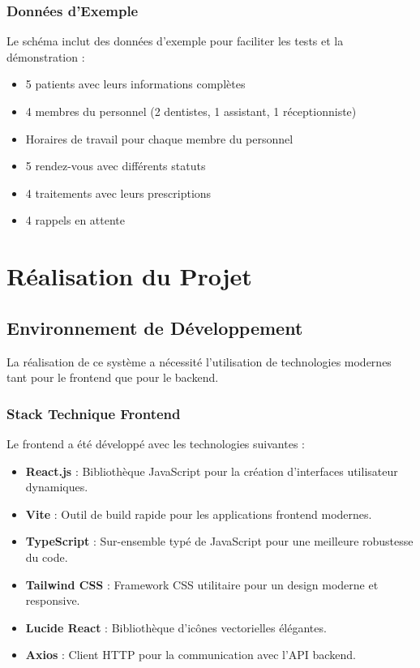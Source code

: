 \documentclass[12pt,a4paper]{report}
\begin{document}
\subsection{Données d'Exemple}

Le schéma inclut des données d'exemple pour faciliter les tests et la démonstration :

\begin{itemize}
    \item 5 patients avec leurs informations complètes
    \item 4 membres du personnel (2 dentistes, 1 assistant, 1 réceptionniste)
    \item Horaires de travail pour chaque membre du personnel
    \item 5 rendez-vous avec différents statuts
    \item 4 traitements avec leurs prescriptions
    \item 4 rappels en attente
\end{itemize}

\chapter{Réalisation du Projet}

\section{Environnement de Développement}

La réalisation de ce système a nécessité l'utilisation de technologies modernes tant pour le frontend que pour le backend.

\subsection{Stack Technique Frontend}

Le frontend a été développé avec les technologies suivantes :
\begin{itemize}
    \item \textbf{React.js} : Bibliothèque JavaScript pour la création d'interfaces utilisateur dynamiques.
    \item \textbf{Vite} : Outil de build rapide pour les applications frontend modernes.
    \item \textbf{TypeScript} : Sur-ensemble typé de JavaScript pour une meilleure robustesse du code.
    \item \textbf{Tailwind CSS} : Framework CSS utilitaire pour un design moderne et responsive.
    \item \textbf{Lucide React} : Bibliothèque d'icônes vectorielles élégantes.
    \item \textbf{Axios} : Client HTTP pour la communication avec l'API backend.
\end{itemize}
\end{document}
